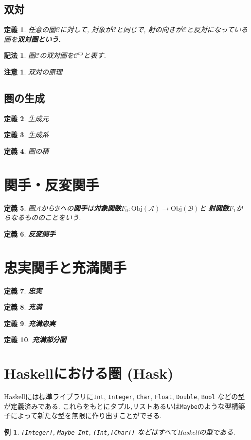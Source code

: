 \documentclass{jsbook}
\theoremstyle{plain}
\newtheorem{Def}{定義}[chapter]
\newtheorem{Notation}{記法}[chapter]
\newtheorem{caution}{注意}[chapter]
\newtheorem{example}{例}[chapter]
\begin{document}
\subsection{双対}
\begin{Def}
任意の圏$\mathscr{C}$に対して, 対象が$\mathscr{C}$と同じで, 射の向きが$\mathcal{C}$と反対になっている圏を\bf{双対圏}という.
\end{Def}
\begin{Notation}
圏$\mathscr{C}$の双対圏を$\mathscr{C}^{\mathrm{op}}$と表す.
\end{Notation}
\begin{caution}
双対の原理
\end{caution}
\subsection{圏の生成}
\begin{Def}
生成元
\end{Def}
\begin{Def}
生成系
\end{Def}
\begin{Def}
圏の積
\end{Def}
\section{関手・反変関手}
\begin{Def}
圏$\mathscr{A}$から$\mathscr{B}$への{\bf 関手}は{\bf 対象関数}$F_0:\mathrm{Obj}(\mathscr{A})\rightarrow\mathrm{Obj}(\mathscr{B})$と
{\bf 射関数}$F_1$からなるもののことをいう.
\end{Def}
\begin{Def}
{\bf 反変関手}
\end{Def}

\section{忠実関手と充満関手}
\begin{Def}
{\bf 忠実}
\end{Def}
\begin{Def}
{\bf 充満}
\end{Def}
\begin{Def}
{\bf 充満忠実}
\end{Def}
\begin{Def}
{\bf 充満部分圏}
\end{Def}
\section{Haskellにおける圏 (Hask)}
Haskellには標準ライブラリに\verb|Int|, \verb|Integer|, 
\verb|Char|,
\verb|Float|,
\verb|Double|,
\verb|Bool|
などの型が定義済みである.
これらをもとにタプル,リストあるいは\verb|Maybe|のような型構築子によって新たな型を無限に作り出すことができる.
\begin{example}
\verb|[Integer]|, \verb|Maybe Int|,
\verb|(Int,[Char])| などはすべてHaskellの型である.
\end{example}
\end{document}
